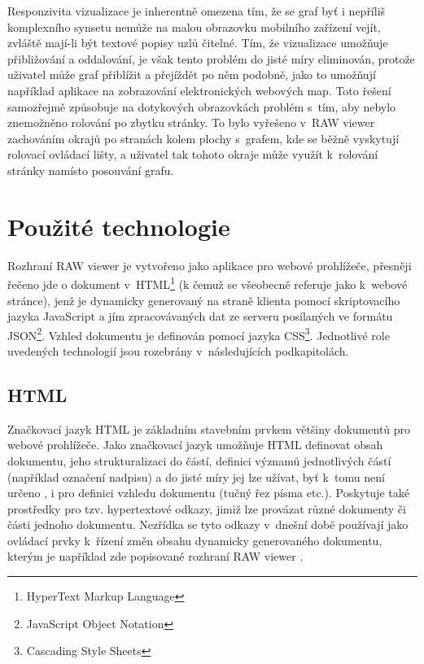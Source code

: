 \documentclass[a4paper,11pt,openany,twoside]{book}
\newcommand{\simplywn}{RAW viewer }
\begin{document}
				Responzivita vizualizace je inherentně omezena tím, že se graf byť i nepříliš komplexního synsetu nemůže na malou obrazovku mobilního zařízení vejít, zvláště mají-li být textové popisy uzlů čitelné. Tím, že vizualizace umožňuje přibližování a oddalování, je však tento problém do jisté míry eliminován, protože uživatel může graf přiblížit a přejíždět po něm podobně, jako to umožňují například aplikace na zobrazování elektronických webových map. Toto řešení samozřejmě způsobuje na dotykových obrazovkách problém s~tím, aby nebylo znemožněno rolování po zbytku stránky. To bylo vyřešeno v~\simplywn zachováním okrajů po stranách kolem plochy s~grafem, kde se běžně vyskytují rolovací ovládací lišty, a uživatel tak tohoto okraje může využít k~rolování stránky namísto posouvání grafu.


		\chapter{Použité technologie}
		\label{cha:techno}

			Rozhraní \simplywn je vytvořeno jako aplikace pro webové prohlížeče, přesněji řečeno jde o dokument v~HTML\footnote{HyperText Markup Language} (k čemuž se všeobecně referuje jako k~webové stránce), jenž je dynamicky generovaný na straně klienta pomocí skriptovacího jazyka JavaScript a jím zpracovávaných dat ze serveru posílaných ve formátu JSON\footnote{JavaScript Object Notation}. Vzhled dokumentu je definován pomocí jazyka CSS\footnote{Cascading Style Sheets}. Jednotlivé role uvedených technologií jsou rozebrány v~následujících podkapitolách.

			\section{HTML}

				Značkovací jazyk HTML je základním stavebním prvkem většiny dokumentů pro webové prohlížeče. Jako značkovací jazyk umožňuje HTML definovat obsah dokumentu, jeho strukturalizaci do částí, definici významů jednotlivých částí (například označení nadpisu) a do jisté míry jej lze užívat, byť k~tomu není určeno \parencite{cssWeb}, i pro definici vzhledu dokumentu (tučný řez písma etc.). Poskytuje také prostředky pro tzv. hypertextové odkazy, jimiž lze provázat různé dokumenty či části jednoho dokumentu. Nezřídka se tyto odkazy v~dnešní době používají jako ovládací prvky k~řízení změn obsahu dynamicky generovaného dokumentu, kterým je například zde popisované rozhraní \simplywn. 
\end{document}
